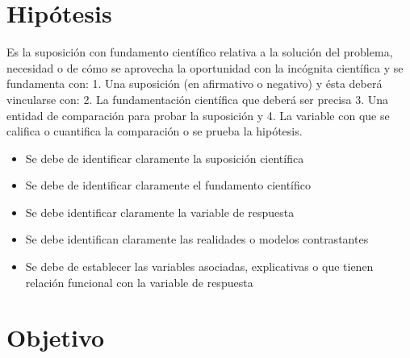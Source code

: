     \section{Hipótesis}
    
    Es la suposición con fundamento científico relativa a la solución del problema, necesidad o de cómo se aprovecha la oportunidad con la incógnita científica y se fundamenta con: 1. Una suposición (en afirmativo o negativo) y ésta deberá vincularse con:
    2. La fundamentación científica que deberá ser precisa 3. Una entidad de comparación para probar la suposición y
    4. La variable con que se califica o cuantifica la comparación o se prueba la hipótesis.
    
    \begin{itemize}
        \item Se debe de identificar claramente la suposición científica
        \item Se debe de identificar claramente el fundamento científico
        \item Se debe identificar claramente la variable de respuesta
        \item Se debe identifican claramente las realidades o modelos contrastantes
        \item Se debe de establecer las variables asociadas, explicativas o que tienen relación funcional con la variable de respuesta
    \end{itemize}
    \section{Objetivo}
    
